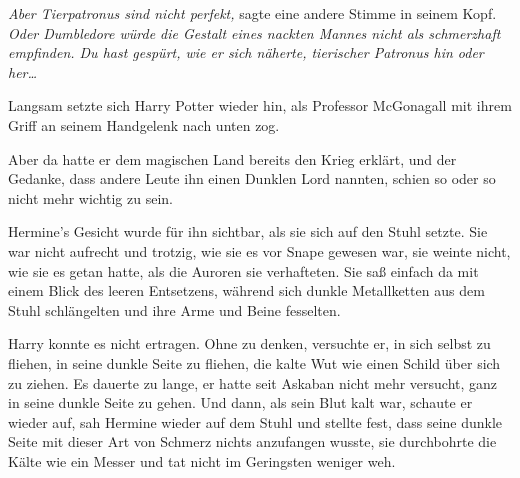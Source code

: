 \emph{Aber Tierpatronus sind nicht perfekt,} sagte eine andere Stimme in seinem Kopf. \emph{Oder Dumbledore würde die Gestalt eines nackten Mannes nicht als schmerzhaft empfinden. Du hast gespürt, wie er sich näherte, tierischer Patronus hin oder her…}

Langsam setzte sich Harry Potter wieder hin, als Professor McGonagall mit ihrem Griff an seinem Handgelenk nach unten zog.

Aber da hatte er dem magischen Land bereits den Krieg erklärt, und der Gedanke, dass andere Leute ihn einen Dunklen Lord nannten, schien so oder so nicht mehr wichtig zu sein.

Hermine’s Gesicht wurde für ihn sichtbar, als sie sich auf den Stuhl setzte. Sie war nicht aufrecht und trotzig, wie sie es vor Snape gewesen war, sie weinte nicht, wie sie es getan hatte, als die Auroren sie verhafteten. Sie saß einfach da mit einem Blick des leeren Entsetzens, während sich dunkle Metallketten aus dem Stuhl schlängelten und ihre Arme und Beine fesselten.

Harry konnte es nicht ertragen. Ohne zu denken, versuchte er, in sich selbst zu fliehen, in seine dunkle Seite zu fliehen, die kalte Wut wie einen Schild über sich zu ziehen. Es dauerte zu lange, er hatte seit Askaban nicht mehr versucht, ganz in seine dunkle Seite zu gehen. Und dann, als sein Blut kalt war, schaute er wieder auf, sah Hermine wieder auf dem Stuhl und stellte fest, dass seine dunkle Seite mit dieser Art von Schmerz nichts anzufangen wusste, sie durchbohrte die Kälte wie ein Messer und tat nicht im Geringsten weniger weh.

